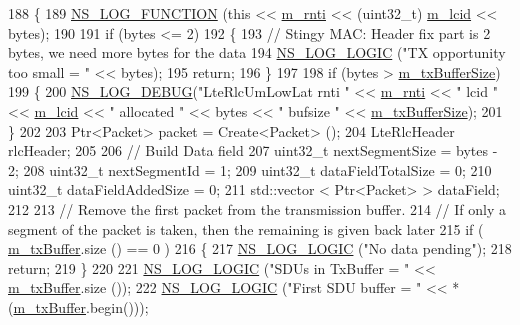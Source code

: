 \begin{DoxyCode}
188 \{
189   \hyperlink{log-macros-disabled_8h_a90b90d5bad1f39cb1b64923ea94c0761}{NS\_LOG\_FUNCTION} (\textcolor{keyword}{this} << \hyperlink{classns3_1_1LteRlc_a48ab0a78e7f2687337075b1c8832df70}{m\_rnti} << (uint32\_t) \hyperlink{classns3_1_1LteRlc_a051085e9b27883e7ba4b98ad7242fd8a}{m\_lcid} << bytes);
190 
191   \textcolor{keywordflow}{if} (bytes <= 2)
192     \{
193       \textcolor{comment}{// Stingy MAC: Header fix part is 2 bytes, we need more bytes for the data}
194       \hyperlink{group__logging_ga88acd260151caf2db9c0fc84997f45ce}{NS\_LOG\_LOGIC} (\textcolor{stringliteral}{"TX opportunity too small = "} << bytes);
195       \textcolor{keywordflow}{return};
196     \}
197 
198   \textcolor{keywordflow}{if} (bytes > \hyperlink{classns3_1_1LteRlcUmLowLat_a730b3933118b7d511e4aedab828e07aa}{m\_txBufferSize})
199    \{
200      \hyperlink{group__logging_ga413f1886406d49f59a6a0a89b77b4d0a}{NS\_LOG\_DEBUG}(\textcolor{stringliteral}{"LteRlcUmLowLat rnti "} << \hyperlink{classns3_1_1LteRlc_a48ab0a78e7f2687337075b1c8832df70}{m\_rnti} << \textcolor{stringliteral}{" lcid "} << 
      \hyperlink{classns3_1_1LteRlc_a051085e9b27883e7ba4b98ad7242fd8a}{m\_lcid} << \textcolor{stringliteral}{" allocated "} << bytes << \textcolor{stringliteral}{" bufsize "} << \hyperlink{classns3_1_1LteRlcUmLowLat_a730b3933118b7d511e4aedab828e07aa}{m\_txBufferSize});
201    \}
202 
203   Ptr<Packet> packet = Create<Packet> ();
204   LteRlcHeader rlcHeader;
205 
206   \textcolor{comment}{// Build Data field}
207   uint32\_t nextSegmentSize = bytes - 2;
208   uint32\_t nextSegmentId = 1;
209   uint32\_t dataFieldTotalSize = 0;
210   uint32\_t dataFieldAddedSize = 0;
211   std::vector < Ptr<Packet> > dataField;
212 
213   \textcolor{comment}{// Remove the first packet from the transmission buffer.}
214   \textcolor{comment}{// If only a segment of the packet is taken, then the remaining is given back later}
215   \textcolor{keywordflow}{if} ( \hyperlink{classns3_1_1LteRlcUmLowLat_aaeef0eed7788f26d7564a84a0c546f74}{m\_txBuffer}.size () == 0 )
216     \{
217       \hyperlink{group__logging_ga88acd260151caf2db9c0fc84997f45ce}{NS\_LOG\_LOGIC} (\textcolor{stringliteral}{"No data pending"});
218       \textcolor{keywordflow}{return};
219     \}
220 
221   \hyperlink{group__logging_ga88acd260151caf2db9c0fc84997f45ce}{NS\_LOG\_LOGIC} (\textcolor{stringliteral}{"SDUs in TxBuffer  = "} << \hyperlink{classns3_1_1LteRlcUmLowLat_aaeef0eed7788f26d7564a84a0c546f74}{m\_txBuffer}.size ());
222   \hyperlink{group__logging_ga88acd260151caf2db9c0fc84997f45ce}{NS\_LOG\_LOGIC} (\textcolor{stringliteral}{"First SDU buffer  = "} << *(\hyperlink{classns3_1_1LteRlcUmLowLat_aaeef0eed7788f26d7564a84a0c546f74}{m\_txBuffer}.begin()));

\end{DoxyCode}
